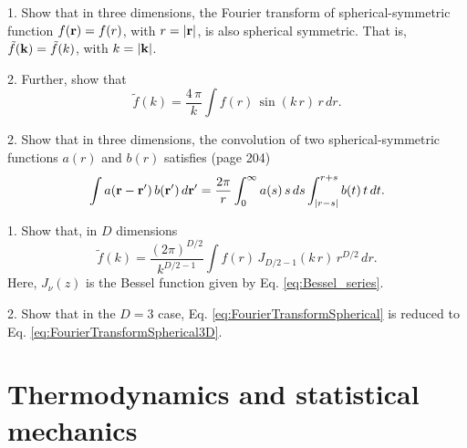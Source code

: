 \documentclass[12pt]{book}
\begin{document}
1. Show that in three dimensions,
the Fourier transform of spherical-symmetric function
$f(\boldsymbol{\mathbf{r}}) = f(r)$, with $r = |\boldsymbol{\mathbf{r}}|$,
is also spherical symmetric.
%
That is, $\tilde f(\boldsymbol{\mathbf{k}}) = \tilde f(k)$, with $k = |\boldsymbol{\mathbf{k}}|$.

2. Further, show that
\begin{equation}
  \tilde f(k)
=
\frac{ 4 \, \pi } {k}
  \int
  f(r) \,
  \sin(k\,r) \,
  r \,
  dr.
  \label{eq:FourierTransformSpherical3D}
\end{equation}

2. Show that in three dimensions,
the convolution of
two spherical-symmetric functions $a(r)$ and $b(r)$
satisfies\cite{hill} (page 204)
\[
  \int a(\boldsymbol{\mathbf{r}} - \boldsymbol{\mathbf{r}}') \, b(\boldsymbol{\mathbf{r}}') \, d\boldsymbol{\mathbf{r}}'
=
  \frac{2\pi}{r}
  \int_0^\infty a(s) \, s \, ds
  \int_{|r-s|}^{r+s} b(t) \, t \, dt.
\]






1. Show that, in $D$ dimensions
\begin{equation}
  \tilde f(k)
=
  \frac{(2 \pi)^{D/2}} {k^{D/2 - 1}}
  \int
  f(r) \,
  J_{D/2-1}(k\,r) \,
  r^{D/2} \,
  dr.
  \label{eq:FourierTransformSpherical}
\end{equation}
Here, $J_\nu(z)$ is the Bessel function
given by Eq. \eqref{eq:Bessel_series}.


2. Show that in the $D = 3$ case,
Eq. \eqref{eq:FourierTransformSpherical}
is reduced to
Eq. \eqref{eq:FourierTransformSpherical3D}.




\chapter{Thermodynamics and statistical mechanics}
\end{document}

